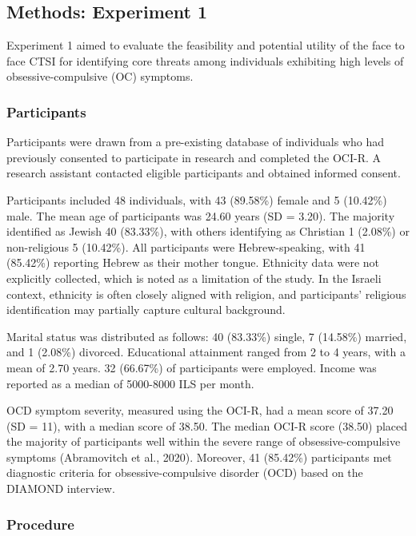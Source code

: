 \documentclass[
  man,floatsintext]{apa7}
\begin{document}
\subsection{Methods: Experiment 1}\label{methods-experiment-1}

Experiment 1 aimed to evaluate the feasibility and potential utility of the face to face CTSI for identifying core threats among individuals exhibiting high levels of obsessive-compulsive (OC) symptoms.

\subsubsection{Participants}\label{participants}

Participants were drawn from a pre-existing database of individuals who had previously consented to participate in research and completed the OCI-R.
A research assistant contacted eligible participants and obtained informed consent.

Participants included 48 individuals, with 43 (89.58\%) female and 5 (10.42\%) male.
The mean age of participants was 24.60 years (SD = 3.20).
The majority identified as Jewish 40 (83.33\%), with others identifying as Christian 1 (2.08\%) or non-religious 5 (10.42\%).
All participants were Hebrew-speaking, with 41 (85.42\%) reporting Hebrew as their mother tongue.
Ethnicity data were not explicitly collected, which is noted as a limitation of the study.
In the Israeli context, ethnicity is often closely aligned with religion, and participants' religious identification may partially capture cultural background.

Marital status was distributed as follows: 40 (83.33\%) single, 7 (14.58\%) married, and 1 (2.08\%) divorced.
Educational attainment ranged from 2 to 4 years, with a mean of 2.70 years.
32 (66.67\%) of participants were employed.
Income was reported as a median of 5000-8000 ILS per month.

OCD symptom severity, measured using the OCI-R, had a mean score of 37.20 (SD = 11), with a median score of 38.50.
The median OCI-R score (38.50) placed the majority of participants well within the severe range of obsessive-compulsive symptoms (Abramovitch et al., 2020).
Moreover, 41 (85.42\%) participants met diagnostic criteria for obsessive-compulsive disorder (OCD) based on the DIAMOND interview.

\subsubsection{Procedure}\label{procedure}
\end{document}
